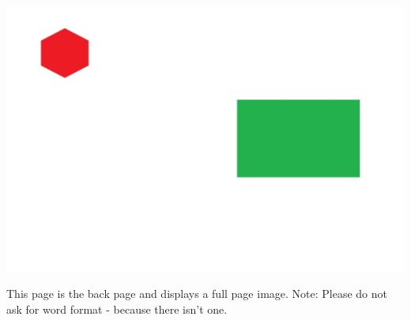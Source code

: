 \clearpage
 \pagestyle{empty}

\begin{minipage}[c][20cm][c]{\textwidth} 
	\includegraphics*[width=\textwidth,height=\textheight,keepaspectratio]
	{images/backdrop.jpg}
\end{minipage}

\vfill
This page is the back page and displays a full page image.
Note: Please do not ask for word format - because there isn't one.
  
